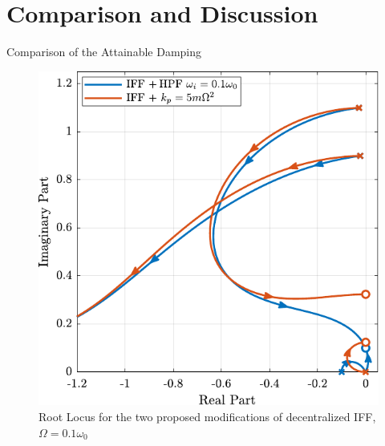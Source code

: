 \documentclass[t, minted]{clean-beamer}
\begin{document}
\section{Comparison and Discussion}
\label{sec:org79d4359}
\begin{frame}[label={sec:org7dda174}]{Comparison of the Attainable Damping}
\begin{figure}[htbp]
\centering
\includegraphics[width=0.7\linewidth]{figs/comp_root_locus.pdf}
\caption{Root Locus for the two proposed modifications of decentralized IFF, \(\Omega = 0.1 \omega_0\)}
\end{figure}
\end{frame}
\end{document}
